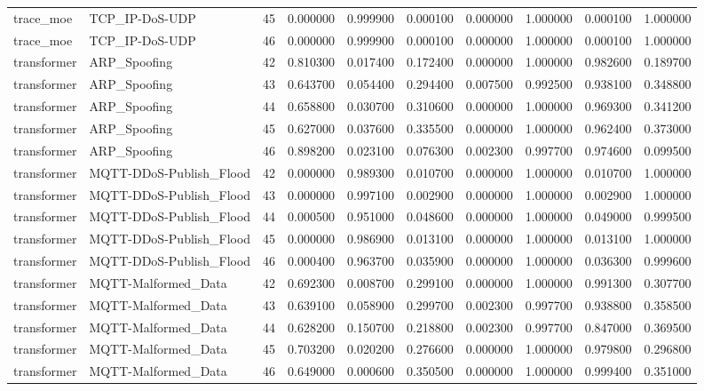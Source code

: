 \begin{table}
\begin{tabular}{llrrrrrrrr}
trace\_moe & TCP\_IP-DoS-UDP & 45 & 0.000000 & 0.999900 & 0.000100 & 0.000000 & 1.000000 & 0.000100 & 1.000000 \\
trace\_moe & TCP\_IP-DoS-UDP & 46 & 0.000000 & 0.999900 & 0.000100 & 0.000000 & 1.000000 & 0.000100 & 1.000000 \\
transformer & ARP\_Spoofing & 42 & 0.810300 & 0.017400 & 0.172400 & 0.000000 & 1.000000 & 0.982600 & 0.189700 \\
transformer & ARP\_Spoofing & 43 & 0.643700 & 0.054400 & 0.294400 & 0.007500 & 0.992500 & 0.938100 & 0.348800 \\
transformer & ARP\_Spoofing & 44 & 0.658800 & 0.030700 & 0.310600 & 0.000000 & 1.000000 & 0.969300 & 0.341200 \\
transformer & ARP\_Spoofing & 45 & 0.627000 & 0.037600 & 0.335500 & 0.000000 & 1.000000 & 0.962400 & 0.373000 \\
transformer & ARP\_Spoofing & 46 & 0.898200 & 0.023100 & 0.076300 & 0.002300 & 0.997700 & 0.974600 & 0.099500 \\
transformer & MQTT-DDoS-Publish\_Flood & 42 & 0.000000 & 0.989300 & 0.010700 & 0.000000 & 1.000000 & 0.010700 & 1.000000 \\
transformer & MQTT-DDoS-Publish\_Flood & 43 & 0.000000 & 0.997100 & 0.002900 & 0.000000 & 1.000000 & 0.002900 & 1.000000 \\
transformer & MQTT-DDoS-Publish\_Flood & 44 & 0.000500 & 0.951000 & 0.048600 & 0.000000 & 1.000000 & 0.049000 & 0.999500 \\
transformer & MQTT-DDoS-Publish\_Flood & 45 & 0.000000 & 0.986900 & 0.013100 & 0.000000 & 1.000000 & 0.013100 & 1.000000 \\
transformer & MQTT-DDoS-Publish\_Flood & 46 & 0.000400 & 0.963700 & 0.035900 & 0.000000 & 1.000000 & 0.036300 & 0.999600 \\
transformer & MQTT-Malformed\_Data & 42 & 0.692300 & 0.008700 & 0.299100 & 0.000000 & 1.000000 & 0.991300 & 0.307700 \\
transformer & MQTT-Malformed\_Data & 43 & 0.639100 & 0.058900 & 0.299700 & 0.002300 & 0.997700 & 0.938800 & 0.358500 \\
transformer & MQTT-Malformed\_Data & 44 & 0.628200 & 0.150700 & 0.218800 & 0.002300 & 0.997700 & 0.847000 & 0.369500 \\
transformer & MQTT-Malformed\_Data & 45 & 0.703200 & 0.020200 & 0.276600 & 0.000000 & 1.000000 & 0.979800 & 0.296800 \\
transformer & MQTT-Malformed\_Data & 46 & 0.649000 & 0.000600 & 0.350500 & 0.000000 & 1.000000 & 0.999400 & 0.351000 \\

\end{tabular}
\end{table}
